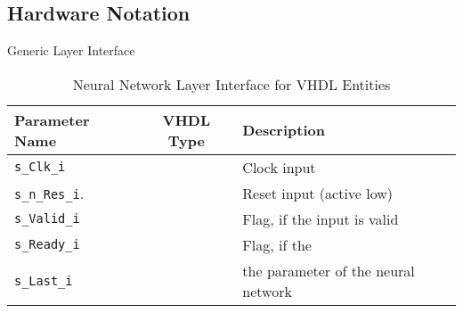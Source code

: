 \subsection{Hardware Notation}


Generic Layer Interface

\begin{table}[h!]
\centering	
\begin{tabular}{l|cl}
	\toprule
	Parameter Name 		   	   & VHDL Type  & Description 								\\
	\midrule
	\texttt{s\_Clk\_i} 	       & \stdlogic  & Clock input								\\
	\texttt{s\_n\_Res\_i}.     & \stdlogic  & Reset input (active low)					\\
	\texttt{s\_Valid\_i} 	   & \stdlogic  & Flag, if the input is valid				\\
	\texttt{s\_Ready\_i} 	   & \stdlogic  & Flag, if the 								\\
	\texttt{s\_Last\_i} 	   & \stdlogic  & the parameter of the neural network		\\
	\bottomrule
\end{tabular}
\caption{Neural Network Layer Interface for VHDL Entities}
\label{tab:hw-layer-interface}
\end{table}

